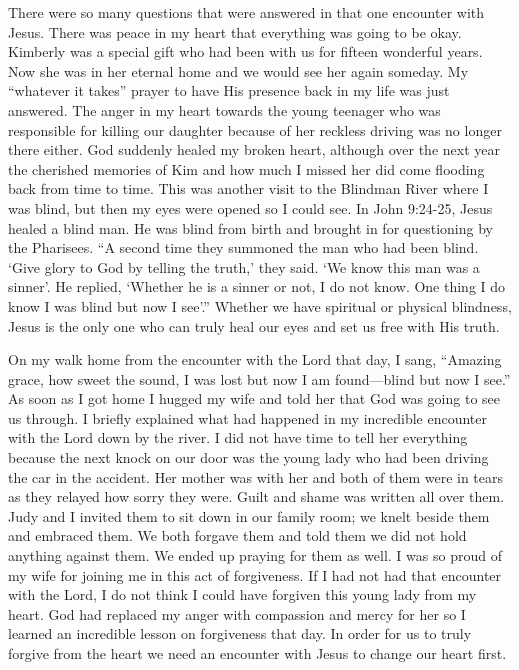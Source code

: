\documentclass[twoside, 12pt]{book}
\begin{document}
There were so many questions that were answered in that one encounter with Jesus. There was peace in my heart that everything was going to be okay. Kimberly was a special gift who had been with us for fifteen wonderful years. Now she was in her eternal home and we would see her again someday. My “whatever it takes” prayer to have His presence back in my life was just answered. The anger in my heart towards the young teenager who was responsible for killing our daughter because of her reckless driving was no longer there either. God suddenly healed my broken heart, although over the next year the cherished memories of Kim and how much I missed her did come flooding back from time to time. This was another visit to the Blindman River where I was blind, but then my eyes were opened so I could see. In John 9:24-25, Jesus  healed a blind man. He was blind from birth and brought in for questioning by the Pharisees. “A second time they summoned the man who had been blind. ‘Give glory to God by telling the truth,’ they said. ‘We know this man was a sinner’. He replied, ‘Whether he is a sinner or not, I do not know. One thing I do know I was blind but now I see’.” Whether we have spiritual or physical blindness, Jesus is the only one who can truly heal our eyes and set us free with His truth.

On my walk home from the encounter with the Lord that day, I sang, “Amazing grace, how sweet the sound, I was lost but now I am found—blind but now I see.” As soon as I got home I hugged my wife and told her that God was going to see us through. I briefly explained what had happened in my incredible encounter with the Lord down by the river. I did not have time to tell her everything because the next knock on our door was the young lady who had been driving the car in the accident. Her mother was with her and both of them were in tears as they relayed how sorry they were. Guilt and shame was written all over them. Judy and I invited them to sit down in our family room; we knelt beside them and embraced them. We both forgave them and told them we did not hold anything against them. We ended up praying for them as well. I was so proud of my wife for joining me in this act of forgiveness. If I had not had that encounter with the Lord, I do not think I could have forgiven this young lady from my heart. God had replaced my anger with compassion and mercy for her so I learned an incredible lesson on forgiveness that day. In order for us to truly forgive from the heart we need an encounter with Jesus to change our heart first.
\end{document}
